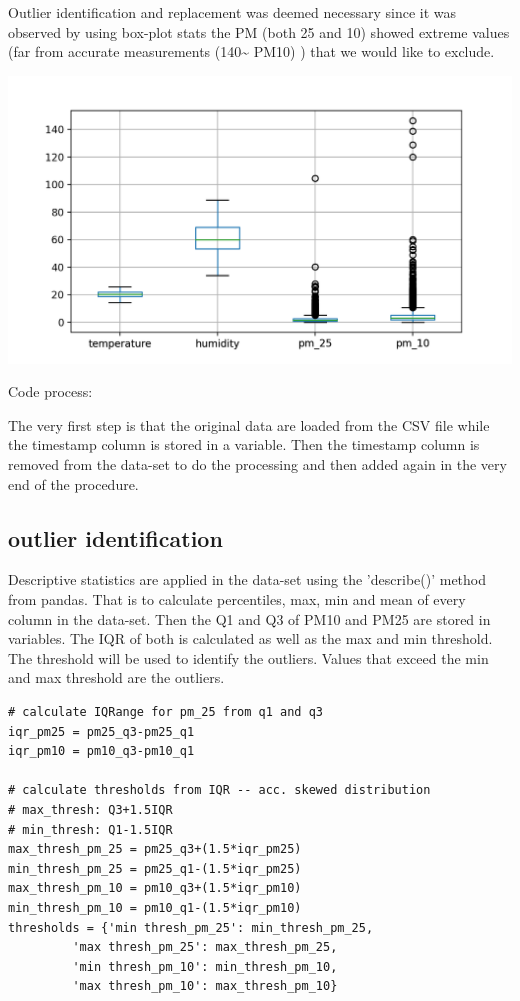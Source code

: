 \documentclass[11pt]{article}
\begin{document}
Outlier identification and replacement was deemed necessary since it was observed by using box-plot stats the PM (both 25 and 10) showed extreme values (far from accurate measurements (140\textasciitilde{} PM10) ) that we would like to exclude.

\begin{center}
\includegraphics[width=.9\linewidth]{./boxplot.png}
\end{center}

Code process:

The very first step is that the original data are loaded from the CSV file while the timestamp column is stored in a variable.  Then the timestamp column is removed from the data-set to do the processing and then added again in the very end of the procedure.

\subsection{outlier identification}
\label{sec:orgb74fda1}
Descriptive statistics are applied in the data-set using the 'describe()' method from pandas.  That is to calculate percentiles, max, min and mean of every column in the data-set.  Then the Q1 and Q3 of PM10 and PM25 are stored in variables.  The IQR of both is calculated as well as the max and min threshold.  The threshold will be used to identify the outliers.  Values that exceed the min and max threshold are the outliers.

\begin{verbatim}
# calculate IQRange for pm_25 from q1 and q3
iqr_pm25 = pm25_q3-pm25_q1
iqr_pm10 = pm10_q3-pm10_q1

# calculate thresholds from IQR -- acc. skewed distribution
# max_thresh: Q3+1.5IQR
# min_thresh: Q1-1.5IQR
max_thresh_pm_25 = pm25_q3+(1.5*iqr_pm25)
min_thresh_pm_25 = pm25_q1-(1.5*iqr_pm25)
max_thresh_pm_10 = pm10_q3+(1.5*iqr_pm10)
min_thresh_pm_10 = pm10_q1-(1.5*iqr_pm10)
thresholds = {'min thresh_pm_25': min_thresh_pm_25,
         'max thresh_pm_25': max_thresh_pm_25,
         'min thresh_pm_10': min_thresh_pm_10,
         'max thresh_pm_10': max_thresh_pm_10}
\end{verbatim}
\end{document}
